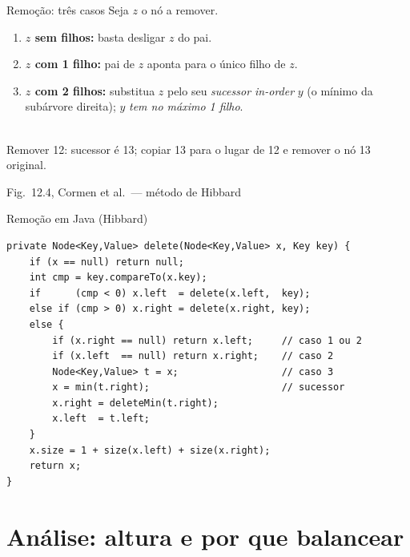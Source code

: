 \documentclass[aspectratio=169]{beamer}
\begin{document}
\begin{frame}[shrink=15]{Remoção: três casos}
Seja $z$ o nó a remover.
\begin{enumerate}
  \item \textbf{$z$ sem filhos:} basta desligar $z$ do pai.
  \item \textbf{$z$ com 1 filho:} pai de $z$ aponta para o único filho de $z$.
  \item \textbf{$z$ com 2 filhos:} substitua $z$ pelo seu \emph{sucessor in-order} $y$
        (o mínimo da subárvore direita); $y$ \emph{tem no máximo 1 filho}.
\end{enumerate}
\vspace{4pt}
\begin{center}
\\
\small Remover \alert{12}: sucessor é 13; copiar 13 para o lugar de 12 e remover o nó 13 original.
\end{center}
\hfill\tiny{Fig.\ 12.4, Cormen et al.\ --- método de Hibbard}
\end{frame}

\begin{frame}[fragile]{Remoção em Java (Hibbard)}
\begin{lstlisting}
private Node<Key,Value> delete(Node<Key,Value> x, Key key) {
    if (x == null) return null;
    int cmp = key.compareTo(x.key);
    if      (cmp < 0) x.left  = delete(x.left,  key);
    else if (cmp > 0) x.right = delete(x.right, key);
    else {
        if (x.right == null) return x.left;     // caso 1 ou 2
        if (x.left  == null) return x.right;    // caso 2
        Node<Key,Value> t = x;                  // caso 3
        x = min(t.right);                       // sucessor
        x.right = deleteMin(t.right);
        x.left  = t.left;
    }
    x.size = 1 + size(x.left) + size(x.right);
    return x;
}
\end{lstlisting}
\end{frame}

\section{Análise: altura e por que balancear}
\end{document}
